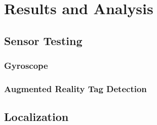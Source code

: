 \chapter{Results and Analysis\label{ch:results}}

\section{Sensor Testing}

	\subsection{Gyroscope}

	\subsection{Augmented Reality Tag Detection}

\section{Localization}
	
